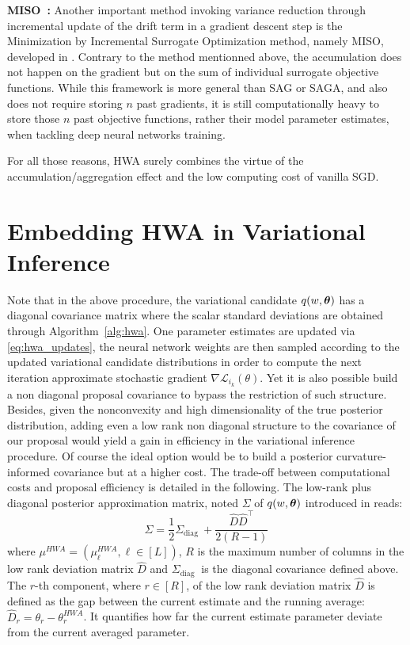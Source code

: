 \documentclass[tablecaption=bottom,wcp]{jmlr} %
\begin{document}
\textbf{MISO~\citep{mairal2015incremental}:} Another important method invoking variance reduction through incremental update of the drift term in a gradient descent step is the Minimization by Incremental Surrogate Optimization method, namely MISO, developed in \citet{mairal2015incremental}.
Contrary to the method mentionned above, the accumulation does not happen on the gradient but on the sum of individual surrogate objective functions.
While this framework is more general than SAG or SAGA, and also does not require storing $n$ past gradients, it is still computationally heavy to store those $n$ past objective functions, rather their model parameter estimates, when tackling deep neural networks training.

For all those reasons, \textsc{HWA} surely combines the virtue of the accumulation/aggregation effect and the low computing cost of vanilla SGD.



\section{Embedding HWA in Variational Inference}\label{app:viandhwa}
Note that in the above procedure, the variational candidate $q(w, \param)$ has a diagonal covariance matrix where the scalar standard deviations are obtained through Algorithm~\ref{alg:hwa}.
One parameter estimates are updated via \eqref{eq:hwa_updates}, the neural network weights are then sampled according to the updated variational candidate distributions in order to compute the next iteration approximate stochastic gradient $\nabla \mathcal{L}_{i_{k}}(\theta)$.
Yet it is also possible build a non diagonal proposal covariance to bypass the restriction of such structure.
Besides, given the nonconvexity and high dimensionality of the true posterior distribution, adding even a low rank non diagonal structure to the covariance of our proposal would yield a gain in efficiency in the variational inference procedure.
Of course the ideal option would be to build a posterior curvature-informed covariance but at a higher cost.
The trade-off between computational costs and proposal efficiency is detailed in the following.
The low-rank plus diagonal posterior approximation matrix, noted $\Sigma$ of $q(w, \param)$ introduced in \citep{maddox2019simple} reads:
\begin{equation}
\Sigma = \frac{1}{2} \Sigma_{\text {diag }}+\frac{\widehat{D} \widehat{D}^{\top}}{2(R-1)}
\end{equation}
where $\mu^{HWA} = (\mu_{\ell}^{HWA}, \ell \in [L])$, $R$ is the maximum number of columns in the low rank deviation matrix $\widehat{D}$ and $\Sigma_{\text {diag }}$ is the diagonal covariance defined above. The $r$-th component, where $r \in [R]$, of the  low rank deviation matrix $\widehat{D}$ is defined as the gap between the current estimate and the running average: $\widehat{D}_r = \theta_r - \theta^{HWA}_r$. It quantifies how far the current estimate parameter deviate from the current averaged parameter.
\end{document}
